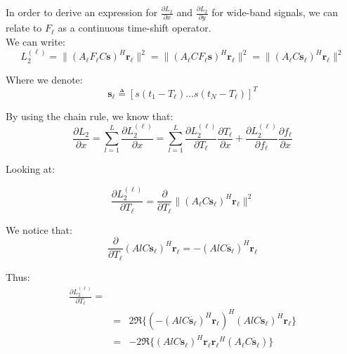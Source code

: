 In order to derive an expression for $\frac{\partial L_2}{\partial x}$ and $\frac{\partial L_2}{\partial y}$ for wide-band signals, we can relate to $F_\ell$ as a continuous time-shift operator.\\

We can write:
\begin{equation}
L_2^{(\ell)}=\|(A_\ell F_\ell C\mathbf{s})^H\mathbf{r_\ell}\|^2 = \|(A_\ell C F_\ell \mathbf{s})^H\mathbf{r_\ell}\|^2= \|(A_\ell C \mathbf{s_\ell})^H\mathbf{r_\ell}\|^2
\end{equation}

Where we denote:
\begin{equation}
\mathbf{s_\ell} \triangleq [s(t_1-T_\ell) \dots s(t_N-T_\ell)]^T                                                           
\end{equation}

By using the chain rule, we know that:
\begin{equation}
\label{eq:d_l_2_d_x}
\frac{\partial L_2}{\partial x} = \sum_{l=1}^L \frac{\partial L_2^{(\ell)}}{\partial x}=\sum_{l=1}^L \frac{\partial L_2^{(\ell)}}{\partial T_\ell}\frac{\partial T_\ell}{\partial x}+\frac{\partial L_2^{(\ell)}}{\partial f_\ell}\frac{\partial f_\ell}{\partial x}
\end{equation}

Looking at:

\begin{equation}
\frac{\partial L_2^{(\ell)}}{\partial T_\ell} = \frac{\partial}{\partial T_\ell} \|(A_\ell C \mathbf{s_\ell})^H\mathbf{r_\ell}\|^2
\end{equation}

We notice that:
\begin{equation}
\frac{\partial}{\partial T_\ell} (Al C \mathbf{s_\ell})^H \mathbf{r_\ell} = - (Al C \mathbf{\dot{s_\ell}})^H \mathbf{r_\ell}
\end{equation}

Thus:
\begin{eqnarray}
\frac{\partial L_2^{(\ell)}}{\partial T_\ell} = \\
&=& 2 \Re \{(- (Al C \mathbf{\dot{s_\ell}})^H \mathbf{r_\ell})^H (Al C \mathbf{s_\ell})^H \mathbf{r_\ell} \} \nonumber\\
&=& -2 \Re \{(Al C \mathbf{s_\ell})^H \mathbf{r_\ell} \mathbf{r_\ell}^H (A_\ell C \mathbf{\dot{s_\ell}})\} \nonumber
\end{eqnarray}

